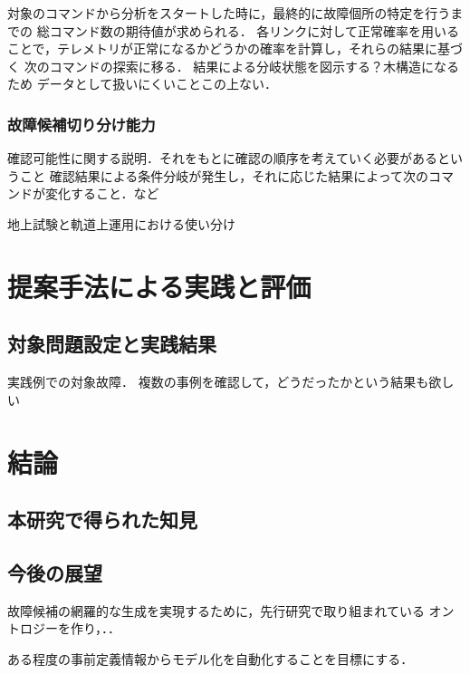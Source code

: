 \documentclass[11pt]{jsarticle}%
\begin{document}
\begin{multicols}{2}
  対象のコマンドから分析をスタートした時に，最終的に故障個所の特定を行うまでの
  総コマンド数の期待値が求められる．
  各リンクに対して正常確率を用いることで，テレメトリが正常になるかどうかの確率を計算し，それらの結果に基づく
  次のコマンドの探索に移る．
  結果による分岐状態を図示する？木構造になるため
  データとして扱いにくいことこの上ない．

  \subsubsection{故障候補切り分け能力}

  確認可能性に関する説明．それをもとに確認の順序を考えていく必要があるということ
  確認結果による条件分岐が発生し，それに応じた結果によって次のコマンドが変化すること．など
  


  地上試験と軌道上運用における使い分け

  \section{提案手法による実践と評価}
  \subsection{対象問題設定と実践結果}
  実践例での対象故障．
  複数の事例を確認して，どうだったかという結果も欲しい

  \subsection{}

  \section{結論}
  \subsection{本研究で得られた知見}
  
  \subsection{今後の展望}

  故障候補の網羅的な生成を実現するために，先行研究で取り組まれている
  オントロジーを作り，．．

  ある程度の事前定義情報からモデル化を自動化することを目標にする．
  


  
   

\end{multicols}
\end{document}

